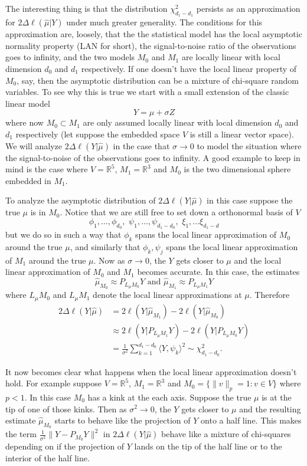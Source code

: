 \documentclass[11pt]{report}
\begin{document}
The interesting thing is that the distribution $\chi^2_{d_1 - d_1}$ persists as an approximation for $2\Delta \ell(\hat\mu|Y)$  under much greater generality. The conditions for this approximation  are, loosely, that the the statistical model has the local asymptotic normality property (LAN for short), the signal-to-noise ratio of the observations goes to infinity, and the two models $M_0$ and $M_1$ are locally linear with local dimension $d_0$ and $d_1$ respectively. If one doesn't have the local linear property of $M_0$, say, then the asymptotic distribution can be a mixture of chi-square random variables.
To see why this is true we start with a small extension of the classic linear model
\[ Y= \mu + {\sigma} Z \]
where now $ M_0\subset M_1$ are  only assumed locally linear  with local dimension $d_0$ and $d_1$ respectively (let suppose the embedded space $V$ is still a linear vector space). We will analyze  $2\Delta \ell(Y|\hat\mu)$  in the case that $\sigma\rightarrow 0$  to model the situation where the signal-to-noise of the observations goes to infinity.  A good example to keep in mind is  the case where  $V=\mathbb R^5$, $M_1=\mathbb R^3$ and $M_0$ is the two dimensional sphere embedded in $M_1$. 

To analyze the asymptotic distribution of $2\Delta \ell(Y|\hat\mu)$ in this case suppose the true $\mu$ is in  $ M_0$.
Notice that we are still free to set down a orthonormal basis of $V$
\[\phi_1,\ldots, \phi_{d_0},\,\, \psi_{1},\ldots, \psi_{d_1 - d_0},\,\, \xi_1,\ldots \xi_{d_1 - d}\]
but we do so in such a way that ${\phi_k}$ spans the local linear approximation of $M_0$ around the true $\mu$, and similarly that ${\phi_k, \psi_j}$ spans the local linear approximation of $M_1$ around the true $\mu$.
Now as $\sigma\rightarrow 0$, the $Y$ gets closer to $\mu$ and the local linear approximation of $M_0$ and $M_1$ becomes accurate. In this case, the estimates
\[ \text{$\hat\mu_{ M_0}\approx P_{L_\mu M_0} Y$ and $\hat\mu_{ M_1}\approx P_{L_\mu M_1} Y$}\]
 where $L_\mu M_0$ and $L_\mu M_1$ denote the local linear approximations at $\mu$. Therefore
\begin{align*}
2\Delta \ell(Y|\hat\mu) 
&= 2\ell(Y|\hat\mu_{M_1}) - 2\ell(Y|\hat\mu_{M_0}) \\
&\approx 2\ell(Y|P_{L_\mu M_1}Y) - 2\ell(Y|P_{L_\mu M_0}Y) \\
 &= \frac{1}{\sigma^2}  \sum_{k=1}^{d_1-d_0}{\langle Y,\psi_k \rangle^2} \sim \chi^2_{d_1 - d_0}.
\end{align*}


It now becomes clear what happens when the local linear approximation doesn't hold. For example suppose $V=\mathbb R^5$, $M_1=\mathbb R^3$ and $M_0=\{ \|v\|_p=1: v\in V\}$ where $p<1$. In this case $M_0$ has a kink at the each axis. Suppose the true $\mu$ is at the tip of one of those kinks. Then as $\sigma^2\rightarrow 0$, the $Y$ gets closer to $\mu$ and the resulting estimate $\hat\mu_{M_0}$ starts to behave like the projection of $Y$ onto a half line. This makes the term $\frac{1}{\sigma^2} \|Y - P_{M_0}Y \|^2$ in $2\Delta \ell(Y|\hat\mu) $ behave like a mixture of chi-squares depending on if the projection of $Y$ lands on the tip of the half line or to the interior of the half line. 
\end{document}

